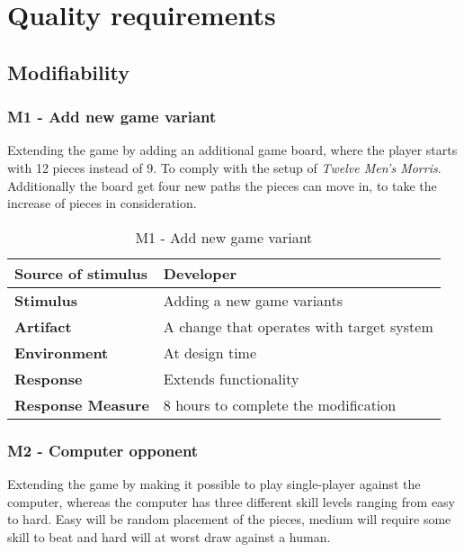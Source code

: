 \newpage

\section{Quality requirements}

\subsection{Modifiability}
\label{section:quality_mod}

\subsubsection{M1 - Add new game variant}

Extending the game by adding an additional game board, where the player starts with 12 pieces instead of 9. To comply  with the setup of \emph{Twelve Men's Morris}. Additionally the board get four new paths the pieces can move in, to take the increase of pieces in consideration.

\begin{table}[h!]
\begin{tabular}{ | p{110pt} | p{250pt}  |}
\hline
\bf Source of stimulus &  Developer  \\ \hline
\bf Stimulus & Adding a new game variants \\ \hline 
\bf Artifact & A change that operates with target system  \\  \hline
\bf Environment & At design time \\ \hline
\bf Response & Extends functionality \\ \hline
\bf Response Measure & 8 hours to complete the modification \\ \hline

\end{tabular}
\caption{M1 - Add new game variant}
\end{table}

\pagebreak

\subsubsection{M2 - Computer opponent}

Extending the game by making it possible to play single-player against the computer, whereas the computer has three different skill levels ranging from easy to hard. Easy will be random placement of the pieces, medium will require some skill to beat and hard will at worst draw against a human.

